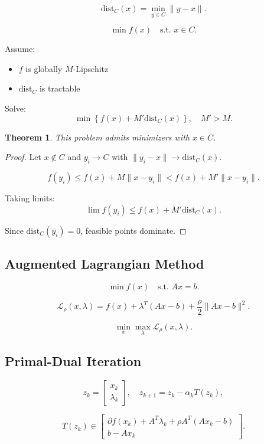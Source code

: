 \documentclass[12pt,oneside]{book}
\numberwithin{equation}{section}
\theoremstyle{definition}
\theoremstyle{plain}
\newtheorem{theorem}{Theorem}[section]
\theoremstyle{remark}
\begin{document}
\[
\mathrm{dist}_C(x) = \min_{y\in C} \|y-x\|.
\]

\[
\min f(x) \quad \text{s.t. } x\in C.
\]

Assume:
\begin{itemize}
\item $f$ is globally $M$-Lipschitz
\item $\mathrm{dist}_C$ is tractable
\end{itemize}

Solve:
\[
\min \left\{ f(x) + M' \mathrm{dist}_C(x) \right\}, \quad M' > M.
\]

\begin{theorem}
This problem admits minimizers with $x\in C$.
\end{theorem}

\begin{proof}
Let $x\notin C$ and $y_i\to C$ with $\|y_i-x\|\to \mathrm{dist}_C(x)$.

\[
f(y_i) \le f(x) + M\|x-y_i\| < f(x) + M'\|x-y_i\|.
\]

Taking limits:
\[
\lim f(y_i) \le f(x) + M'\mathrm{dist}_C(x).
\]

Since $\mathrm{dist}_C(y_i)=0$, feasible points dominate.
\end{proof}

\subsection{Augmented Lagrangian Method}

\[
\min f(x) \quad \text{s.t. } Ax=b.
\]

\[
\mathcal{L}_\rho(x,\lambda)
=
f(x) + \lambda^T(Ax-b) + \frac{\rho}{2}\|Ax-b\|^2.
\]

\[
\min_x \max_\lambda \mathcal{L}_\rho(x,\lambda).
\]

\subsection*{Primal-Dual Iteration}

\[
z_k =
\begin{bmatrix}
x_k \\
\lambda_k
\end{bmatrix},
\quad
z_{k+1} = z_k - \alpha_k T(z_k),
\]

\[
T(z_k) \in
\begin{bmatrix}
\partial f(x_k) + A^T\lambda_k + \rho A^T(Ax_k-b) \\
b - Ax_k
\end{bmatrix}.
\]
\end{document}

